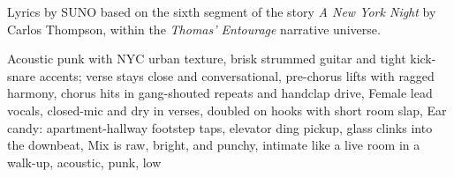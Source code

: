 
\begin{notes}
Lyrics by SUNO based on the sixth segment of the story \emph{A New York Night} by Carlos Thompson, %
within the \emph{Thomas’ Entourage} narrative universe.
\end{notes}
\begin{style}
Acoustic punk with NYC urban texture, brisk strummed guitar and tight kick-snare accents; verse stays close and conversational, pre-chorus lifts with ragged harmony, chorus hits in gang-shouted repeats and handclap drive, Female lead vocals, closed-mic and dry in verses, doubled on hooks with short room slap, Ear candy: apartment-hallway footstep taps, elevator ding pickup, glass clinks into the downbeat, Mix is raw, bright, and punchy, intimate like a live room in a walk-up, acoustic, punk, low
\end{style}
